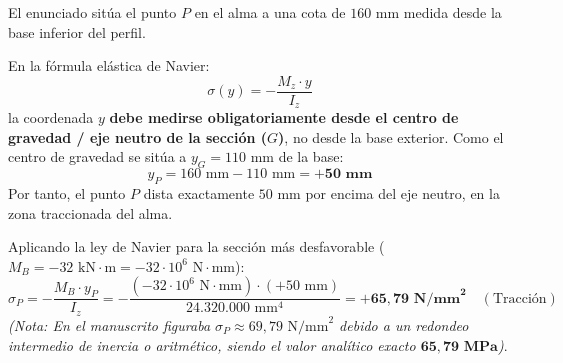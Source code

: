 \begin{tcolorbox}[colback=blue!5!white,colframe=blue!75!black,title=\textbf{Respuesta a la Duda Manuscrita: ¿Por qué la distancia es $y_P = 50\text{ mm}$ y no $160\text{ mm}$?}]
    El enunciado sitúa el punto $P$ en el alma a una cota de $160\text{ mm}$ medida desde la base inferior del perfil.

    En la fórmula elástica de Navier:
    \begin{equation}
        \sigma(y) = -\frac{M_z \cdot y}{I_z}
    \end{equation}
    la coordenada $y$ \textbf{debe medirse obligatoriamente desde el centro de gravedad / eje neutro de la sección ($G$)}, no desde la base exterior.
    Como el centro de gravedad se sitúa a $y_G = 110\text{ mm}$ de la base:
    \begin{equation}
        y_P = 160\text{ mm} - 110\text{ mm} = \mathbf{+50\text{ mm}}
    \end{equation}
    Por tanto, el punto $P$ dista exactamente $50\text{ mm}$ por encima del eje neutro, en la zona traccionada del alma.
\end{tcolorbox}

Aplicando la ley de Navier para la sección más desfavorable ($M_B = -32\text{ kN}\cdot\text{m} = -32 \cdot 10^6\text{ N}\cdot\text{mm}$):
\begin{equation}
    \sigma_P = -\frac{M_B \cdot y_P}{I_z} = -\frac{(-32 \cdot 10^6\text{ N}\cdot\text{mm}) \cdot (+50\text{ mm})}{24.320.000\text{ mm}^4} = \mathbf{+65{,}79\text{ N/mm}^2} \quad (\text{Tracción})
\end{equation}
\textit{(Nota: En el manuscrito figuraba $\sigma_P \approx 69{,}79\text{ N/mm}^2$ debido a un redondeo intermedio de inercia o aritmético, siendo el valor analítico exacto $\mathbf{65{,}79\text{ MPa}}$)}.

